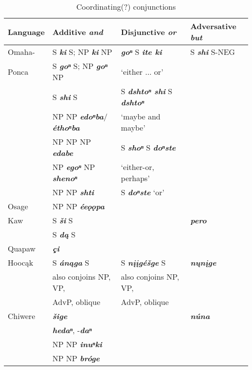\documentclass[output=paper]{LSP/langsci}
\begin{document}
\begin{table}
\caption{Coordinating(?) conjunctions} \label{coord}
\small
\begin{tabular}{ l  l  l  l  }
\lsptoprule
Language & Additive \textbf{\textit{and}} & Disjunctive \textbf{\textit{or}} & Adversative \textbf{\textit{but}} \\
\midrule
Omaha- & S \textbf{\textit{ki}} S; NP \textbf{\textit{ki}} NP & \textbf{\textit{goⁿ}}  S \textbf{\textit{ite ki}} &  S \textbf{\textit{shi}} S-NEG \\
Ponca & S \textbf{\textit{goⁿ}} S; NP \textbf{\textit{goⁿ}} NP & `either ... or' & \\
& S \textbf{\textit{shi}} S & S  \textbf{\textit{dshtoⁿ shi}}  S \textbf{\textit{dshtoⁿ}} & \\
& NP NP \textbf{\textit{edoⁿba}}/ \textbf{\textit{éthoⁿba}} & `maybe and maybe' & \\
& NP NP NP \textbf{\textit{edabe}} & S \textbf{\textit{shoⁿ}} S \textbf{\textit{doⁿste}} & \\
& NP \textbf{\textit{egoⁿ}} NP \textbf{\textit{shenoⁿ}} & `either-or, perhaps' & \\ \vspace{1em}

& NP NP \textbf{\textit{shti}} & S \textbf{\textit{doⁿste}} `or' &  \\  \vspace{1em}
Osage	& NP NP \textbf{\textit{ée\textipa{D}\k{o}\k{o}pa}} &   &   \\ 

Kaw & S \textbf{\textit{\v{s}i}} S &   & \textbf{\textit{pero}} \\  \vspace{1em}
& S \textbf{\textit{d\k{a}}} S & & \\  \vspace{1em}

Quapaw & \textbf{\textit{\c{c}i}} &   &   \\

Hooc\k{a}k & S \textbf{\textit{án\k{a}ga}} S & S \textbf{\textit{n\k{i}\k{i}gé\v{s}ge}} S & \textbf{\textit{n\k{u}n\k{i}ge}} \\
& also conjoins NP, VP,  & also conjoins NP, VP, & \\  \vspace{1em}
& AdvP, oblique & AdvP, oblique & \\

Chiwere & \textbf{\textit{\v{s}ige}} & & \textbf{\textit{núna}} \\
& \textbf{\textit{hedaⁿ}}, -\textbf{\textit{daⁿ}} & & \\
& NP NP \textbf{\textit{inuⁿki}} & & \\  \vspace{1em}
& NP NP \textbf{\textit{bróge}} & & \\


\end{tabular}
\end{table}
\end{document}
